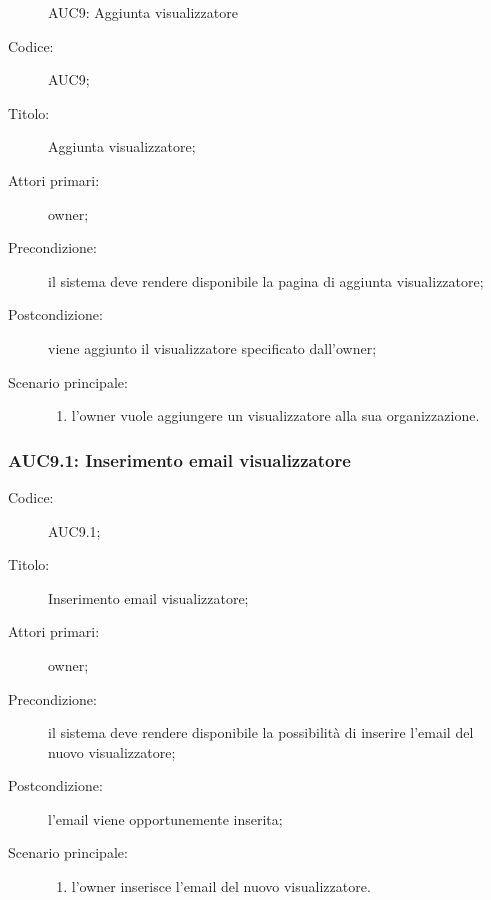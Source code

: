 \documentclass[../../../analisi-dei-requisiti.tex]{subfiles}
\begin{document}
\begin{figure}[H]
  \centering
  \caption{AUC9: Aggiunta visualizzatore}%
  \label{fig:AUC9}
\end{figure}

\begin{description}
  \item[Codice:] AUC9;
  \item[Titolo:] Aggiunta visualizzatore;
  \item[Attori primari:] owner;
  \item[Precondizione:] il sistema deve rendere disponibile la pagina di aggiunta visualizzatore;
  \item[Postcondizione:] viene aggiunto il visualizzatore specificato dall'owner;
  \item[Scenario principale:]
  \begin{enumerate}
    \item l'owner vuole aggiungere un visualizzatore alla sua organizzazione.
  \end{enumerate}
\end{description}

\subsubsection{AUC9.1: Inserimento email visualizzatore}%
\label{subs:AUC9.1}
\begin{description}
  \item[Codice:] AUC9.1;
  \item[Titolo:] Inserimento email visualizzatore;
  \item[Attori primari:] owner;
  \item[Precondizione:] il sistema deve rendere disponibile la possibilità di inserire l'email del nuovo visualizzatore;
  \item[Postcondizione:] l'email viene opportunemente inserita;
  \item[Scenario principale:]
  \begin{enumerate}
    \item l'owner inserisce l'email del nuovo visualizzatore.
  \end{enumerate}
\end{description}
\end{document}
